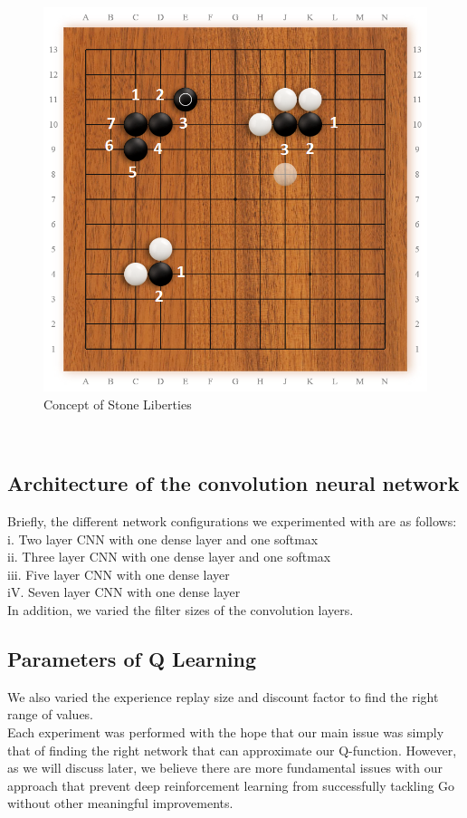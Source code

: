 \begin{figure}[h]
	\centering
	\includegraphics[scale=0.25]{ExampleLiberties}
	\caption{Concept of Stone Liberties}
\label{fig:liberties}
\end{figure}
\\
\subsection{Architecture of the convolution neural network}
Briefly, the different network configurations we experimented with are as follows:
\\
i. Two layer CNN with one dense layer and one softmax
\\
ii. Three layer CNN with one dense layer and one softmax
\\
iii. Five layer CNN with one dense layer
\\
iV. Seven layer CNN with one dense layer
\\
In addition, we varied the filter sizes of the convolution layers.
\subsection{Parameters of Q Learning}
We also varied the experience replay size and discount factor to find the right range of values. 
\\
Each experiment was performed with the hope that our main issue was simply that of finding the right network that can approximate our Q-function. However, as we will discuss later, we believe there are more fundamental issues with our approach that prevent deep reinforcement learning from successfully tackling Go without other meaningful improvements.

